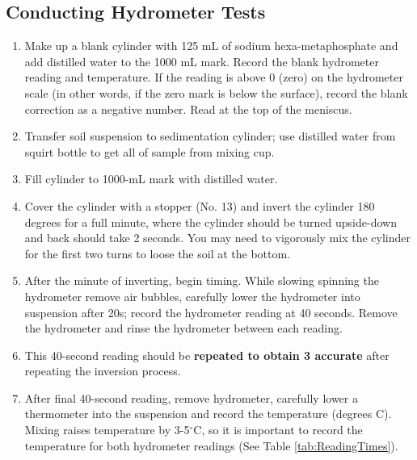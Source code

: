 \documentclass{tufte-handout}
\begin{document}
\subsection{Conducting Hydrometer Tests}

\begin{enumerate}

	\item Make up a blank cylinder with 125 mL of sodium hexa-metaphosphate and add distilled water to the 1000 mL mark.  Record the blank hydrometer reading and temperature. If the reading is above 0 (zero) on the hydrometer scale (in other words, if the zero mark is below the surface), record the blank correction as a negative number.  Read at the top of the meniscus.
	
	\item Transfer soil suspension to sedimentation cylinder; use distilled water from squirt bottle to get all of sample from mixing cup.

	\item Fill cylinder to 1000-mL mark with distilled water.

	\item Cover the cylinder with a stopper (No. 13) and invert the cylinder 180 degrees for a full minute, where the cylinder should be turned upside-down and back should take 2 seconds. You may need to vigorously mix the cylinder for the first two turns to loose the soil at the bottom.
	
	\item After the minute of inverting, begin timing.  While slowing spinning the hydrometer remove air bubbles, carefully lower the hydrometer into suspension after 20s; record the hydrometer reading at 40 seconds. Remove the hydrometer and rinse the hydrometer between each reading. 
	
	\item This 40-second reading should be \textbf{repeated to obtain 3 accurate} after repeating the inversion process.

	\item After final 40-second reading, remove hydrometer, carefully lower a thermometer into the suspension and record the temperature (degrees C).  Mixing raises temperature by 3-5$^\circ$C, so it is important to record the temperature for both hydrometer readings (See Table \ref{tab:ReadingTimes}).
	

\end{enumerate}
\end{document}
